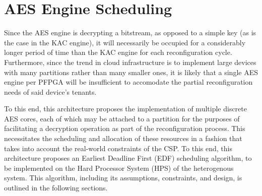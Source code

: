 
\section{AES Engine Scheduling}\label{sec:EDFAlgorithm}

Since the AES engine is decrypting a bitstream, as opposed to a simple key (as is the case in the KAC engine), it will necessarily be occupied for a considerably longer period of time than the KAC engine for each reconfiguration cycle. Furthermore, since the trend in cloud infrastructure is to implement large devices with many partitions rather than many smaller ones, it is likely that a single AES engine per PFPGA will be insufficient to accomodate the partial reconfiguration needs of said device's tenants.

To this end, this architecture proposes the implementation of multiple discrete AES cores, each of which may be attached to a partition for the purposes of facilitating a decryption operation as part of the reconfiguration process. This necessitates the scheduling and allocation of these resources in a fashion that takes into account the real-world constraints of the CSP. To this end, this architecture proposes an Earliest Deadline First (EDF) scheduling algorithm, to be implemented on the Hard Processor System (HPS) of the heterogenous system. This algorithm, including its assumptions, constraints, and design, is outlined in the following sections.

